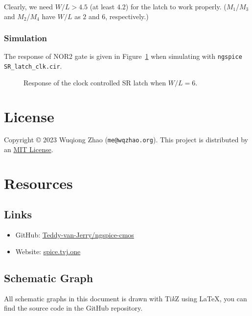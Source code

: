 \documentclass{scrartcl}
\newcommand{\includeres}[1]{\sffamily\scriptsize\vspace{-2em}}
\begin{document}
          Clearly, we need $W/L>4.5$ (at least $4.2$) for the latch to work properly.
          ($M_1$/$M_3$ and $M_2$/$M_4$ have $W/L$ as $2$ and $6$, respectively.)

        \subsubsection{Simulation}

          The response of NOR2 gate is given in Figure~\ref{fig:sr_latch_res}
          when simulating with \texttt{ngspice SR\_latch\_clk.cir}.
          \begin{figure}[htbp]
            \includeres{sr_latch}
            \caption{Response of the clock controlled SR latch when $W/L=6$.}
            \label{fig:sr_latch_res}
          \end{figure}

  \section{License}

    Copyright \copyright{} 2023 Wuqiong Zhao (\texttt{me@wqzhao.org}).
    This project is distributed by an \href{https://github.com/Teddy-van-Jerry/ngspice-cmos/blob/master/LICENSE}{MIT License}.

  \printbibliography

  \newpage
  \appendix
  \section{Resources}

    \subsection{Links}
      \begin{itemize}
        \item GitHub: \href{https://github.com/Teddy-van-Jerry/ngspice-cmos}{Teddy-van-Jerry/ngspice-cmos}
        \item Website: \href{https://spice.tvj.one}{spice.tvj.one}
      \end{itemize}

    \subsection{Schematic Graph}
      All schematic graphs in this document is drawn with Ti\textit{k}Z using \LaTeX{},
      you can find the source code in the GitHub repository.
\end{document}
